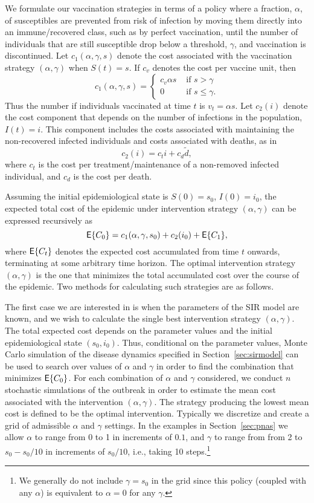 \documentclass[shortnames,nojss]{jss}
\begin{document}
We formulate our vaccination strategies in terms of a policy where a
fraction, $\alpha$, of susceptibles are prevented from risk of
infection by moving them directly into an immune/recovered class, such
as by perfect vaccination, until the number of individuals that are
still susceptible drop below a threshold, $\gamma$, and vaccination is
discontinued. Let $c_1(\alpha,\gamma, s)$ denote the cost associated
with the vaccination strategy $(\alpha,\gamma)$ when $S(t)=s$.  If
$c_v$ denotes the cost per vaccine unit, then
\[
 c_1(\alpha,\gamma,s) = \left\{ \begin{array}{ll}c_v \alpha s &\mbox{ if }
  s>\gamma\\ 0 &\mbox{ if } s\leq \gamma. \end{array}\right.
\]
Thus the number if individuals vaccinated at time $t$ is $v_t=\alpha
s$. Let $c_2(i)$ denote the cost component that depends on the number
of infections in the population, $I(t)=i$.  This component includes
the costs associated with maintaining the non-recovered infected
individuals and costs associated with deaths, as in
\[
c_2(i) = c_t i + c_d \tilde{d},
\]
where $c_t$
is the cost per treatment/maintenance of a non-removed infected
individual, and $c_d$ is the cost per death.  

Assuming the initial epidemiological state is $S(0)=s_0$, $I(0)=i_0$,
the expected total cost of the epidemic under intervention strategy
$(\alpha, \gamma)$ can be expressed recursively as
\begin{equation}
\mathsf{E}\{C_0\} = c_1(\alpha,\gamma, s_0) + c_2(i_0)+ \mathsf{E}\{ C_{1} \},\label{sdp}
\end{equation}
where $\mathsf{E}\{ C_t\}$ denotes the expected cost accumulated from time $t$
onwards, terminating at some arbitrary time horizon.  The optimal
intervention strategy $(\alpha,\gamma)$ is the one that minimizes the
total accumulated cost over the course of the epidemic.  Two methods
for calculating such strategies are as follows.
 
The first case we are interested in is when the parameters of the SIR
model are known, and we wish to calculate the single best intervention
strategy $(\alpha,\gamma)$.  The total expected cost depends on the
parameter values and the initial epidemiological state $(s_0,i_0)$.
Thus, conditional on the parameter values, Monte Carlo simulation of
the disease dynamics specified in Section~\ref{sec:sirmodel} 
can be used to search over values of $\alpha$ and $\gamma$ in order to
find the combination that minimizes $\mathsf{E}\{C_0\}$.  For each combination
of $\alpha$ and $\gamma$ considered, we conduct $n$ stochastic
simulations of the outbreak in order to estimate the mean cost
associated with the intervention $(\alpha,\gamma)$. The strategy
producing the lowest mean cost is defined to be the optimal
intervention. Typically we discretize and create a grid of admissible
$\alpha$ and $\gamma$ settings.  In the examples in
Section~\ref{sec:pnas} we allow $\alpha$ to range from 0 to 1 in
increments of $0.1$, and $\gamma$ to range from from 2 to $s_0-s_0/10$
in increments of $s_0/10$, i.e., taking 10 steps.\footnote{We
  generally do not include $\gamma=s_0$ in the grid since this policy
  (coupled with any $\alpha$) is equivalent to $\alpha=0$ for any
  $\gamma$.}
\end{document}
